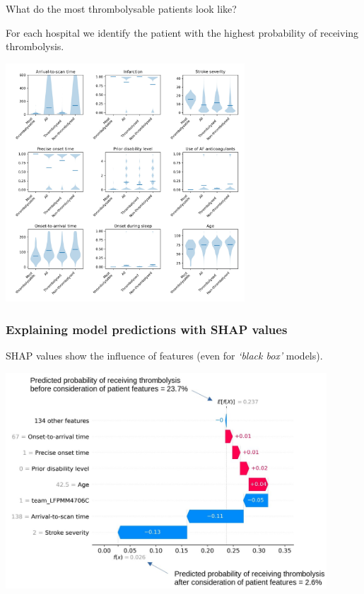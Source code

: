 \documentclass{beamer}
\begin{document}

\begin{frame}{What do the most thrombolysable patients look like?}

\scriptsize For each hospital we identify the patient with the highest probability of receiving thrombolysis.

\begin{center}
\includegraphics[width=0.67\textwidth]{./images/02a_most_thrombolsyable_violin.jpg}
\end{center}

\end{frame}






\begin{frame}
\frametitle{Explaining model predictions with SHAP values}

SHAP values show the influence of features (even for \emph{`black box'} models).

\begin{center}
\includegraphics[width=0.90\textwidth]{./images/waterfall.jpg}
\end{center}
\end{frame}
\end{document}
